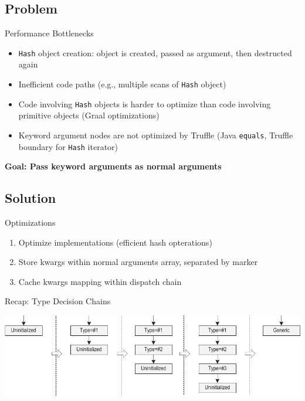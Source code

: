 \documentclass[xcolor=dvipsname,handout]{beamer} %
\begin{document}

\subsection{Problem}

\begin{frame}{Performance Bottlenecks}
\begin{itemize}
    \item \lstinline{Hash} object creation: object is created, passed as argument, then destructed again
    \item Inefficient code paths (e.g., multiple scans of \lstinline{Hash} object)
    \item Code involving \lstinline{Hash} objects is harder to optimize than code involving primitive objects (Graal optimizations)
    \item Keyword argument nodes are not optimized by Truffle (Java \lstinline{equals}, Truffle boundary for \lstinline{Hash} iterator)
\end{itemize}

\begin{table}
    \centering
\textbf{Goal: Pass keyword arguments as normal arguments}
\end{table}
\end{frame}


\subsection{Solution}
\begin{frame}{Optimizations}
\begin{enumerate}
 \item Optimize implementations (efficient hash opterations)
 \item Store kwargs within normal arguments array, separated by marker
 \item Cache kwargs mapping within dispatch chain
\end{enumerate}
\end{frame}

\begin{frame}{Recap: Type Decision Chains}
\begin{table}
    \includegraphics[width=\textwidth]{type_chain.pdf}
\end{table}
\end{frame}
\end{document}
